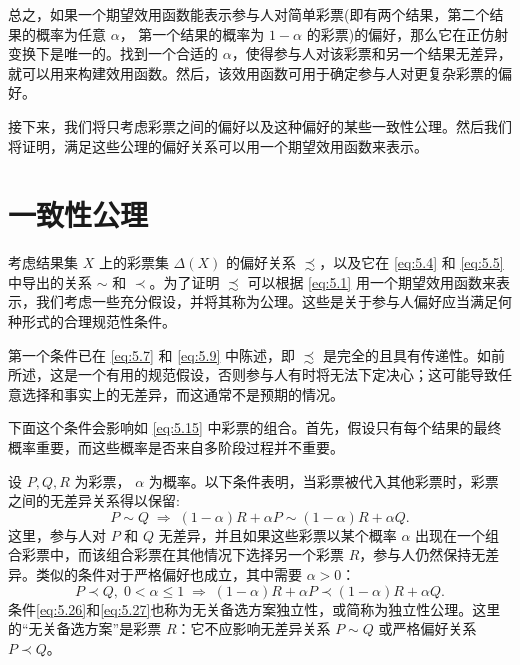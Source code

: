 总之，如果一个期望效用函数能表示参与人对简单彩票(即有两个结果，第二个结果的概率为任意 \(\alpha\)， 第一个结果的概率为 \(1 - \alpha\) 的彩票)的偏好，那么它在正仿射变换下是唯一的。找到一个合适的 \(\alpha\)，使得参与人对该彩票和另一个结果无差异，就可以用来构建效用函数。然后，该效用函数可用于确定参与人对更复杂彩票的偏好。

接下来，我们将只考虑彩票之间的偏好以及这种偏好的某些一致性公理。然后我们将证明，满足这些公理的偏好关系可以用一个期望效用函数来表示。

\section{一致性公理}\label{sec:5.7}

考虑结果集 \(X\) 上的彩票集 \(\Delta \left( X\right)\) 的偏好关系 \(\precsim\)，以及它在 \eqref{eq:5.4} 和 \eqref{eq:5.5} 中导出的关系 \(\sim\) 和 \(\prec\)。为了证明 \(\precsim\) 可以根据 \eqref{eq:5.1} 用一个期望效用函数来表示，我们考虑一些充分假设，并将其称为公理。这些是关于参与人偏好应当满足何种形式的合理规范性条件。

第一个条件已在 \eqref{eq:5.7} 和 \eqref{eq:5.9} 中陈述，即 \(\precsim\) 是完全的且具有传递性。如前所述，这是一个有用的规范假设，否则参与人有时将无法下定决心；{\color{blue}这可能导致任意选择和事实上的无差异，而这通常不是预期的情况。}

下面这个条件会影响如 \eqref{eq:5.15} 中彩票的组合。首先，假设只有每个结果的最终概率重要，而这些概率是否来自多阶段过程并不重要。

设 \(P,Q,R\) 为彩票， \(\alpha\) 为概率。以下条件表明，当彩票被代入其他彩票时，彩票之间的无差异关系得以保留:
\begin{equation}
\label{eq:5.26}
P \sim  Q\; \Rightarrow  \;\left( {1 - \alpha }\right) R + {\alpha P} \sim  \left( {1 - \alpha }\right) R + {\alpha Q}.
\end{equation}
这里，参与人对 \(P\) 和 \(Q\) 无差异，并且如果这些彩票以某个概率 \(\alpha\) 出现在一个组合彩票中，而该组合彩票在其他情况下选择另一个彩票 \(R\)，参与人仍然保持无差异。类似的条件对于严格偏好也成立，其中需要 \(\alpha  > 0\)：
\begin{equation}
\label{eq:5.27}
P \prec  Q,\;0 < \alpha  \leq  1\; \Rightarrow  \;\left( {1 - \alpha }\right) R + {\alpha P} \prec  \left( {1 - \alpha }\right) R + {\alpha Q}.
\end{equation}
条件\eqref{eq:5.26}和\eqref{eq:5.27}也称为无关备选方案独立性，或简称为独立性公理。这里的“无关备选方案”是彩票 \(R\)：它不应影响无差异关系 \(P \sim  Q\) 或严格偏好关系 \(P \prec  Q\)。

